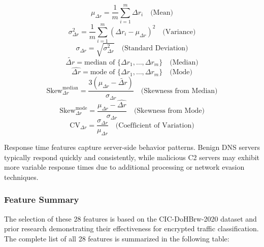 \documentclass[../Main.tex]{subfiles}
\begin{document}
\begin{equation}
\mu_{\Delta r} = \frac{1}{m} \sum_{i=1}^{m} \Delta r_i \quad \text{(Mean)}
\end{equation}
\begin{equation}
\sigma_{\Delta r}^2 = \frac{1}{m} \sum_{i=1}^{m} (\Delta r_i - \mu_{\Delta r})^2 \quad \text{(Variance)}
\end{equation}
\begin{equation}
\sigma_{\Delta r} = \sqrt{\sigma_{\Delta r}^2} \quad \text{(Standard Deviation)}
\end{equation}
\begin{equation}
\widetilde{\Delta r} = \text{median of } \{\Delta r_1, \ldots, \Delta r_m\} \quad \text{(Median)}
\end{equation}
\begin{equation}
\widehat{\Delta r} = \text{mode of } \{\Delta r_1, \ldots, \Delta r_m\} \quad \text{(Mode)}
\end{equation}
\begin{equation}
\text{Skew}_{\Delta r}^{\text{median}} = \frac{3(\mu_{\Delta r} - \widetilde{\Delta r})}{\sigma_{\Delta r}} \quad \text{(Skewness from Median)}
\end{equation}
\begin{equation}
\text{Skew}_{\Delta r}^{\text{mode}} = \frac{\mu_{\Delta r} - \widehat{\Delta r}}{\sigma_{\Delta r}} \quad \text{(Skewness from Mode)}
\end{equation}
\begin{equation}
\text{CV}_{\Delta r} = \frac{\sigma_{\Delta r}}{\mu_{\Delta r}} \quad \text{(Coefficient of Variation)}
\end{equation}

Response time features capture server-side behavior patterns. Benign DNS servers typically respond quickly and consistently, while malicious C2 servers may exhibit more variable response times due to additional processing or network evasion techniques.

\subsubsection{Feature Summary}

The selection of these 28 features is based on the CIC-DoHBrw-2020 dataset \cite{montazeri2020doh} and prior research demonstrating their effectiveness for encrypted traffic classification. The complete list of all 28 features is summarized in the following table:
\end{document}
